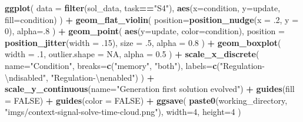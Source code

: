 \documentclass[
]{book}
\newenvironment{Shaded}{\begin{snugshade}}{\end{snugshade}}
\newcommand{\CharTok}[1]{\textcolor[rgb]{0.31,0.60,0.02}{#1}}
\newcommand{\DataTypeTok}[1]{\textcolor[rgb]{0.13,0.29,0.53}{#1}}
\newcommand{\DecValTok}[1]{\textcolor[rgb]{0.00,0.00,0.81}{#1}}
\newcommand{\FloatTok}[1]{\textcolor[rgb]{0.00,0.00,0.81}{#1}}
\newcommand{\KeywordTok}[1]{\textcolor[rgb]{0.13,0.29,0.53}{\textbf{#1}}}
\newcommand{\NormalTok}[1]{#1}
\newcommand{\OperatorTok}[1]{\textcolor[rgb]{0.81,0.36,0.00}{\textbf{#1}}}
\newcommand{\OtherTok}[1]{\textcolor[rgb]{0.56,0.35,0.01}{#1}}
\newcommand{\StringTok}[1]{\textcolor[rgb]{0.31,0.60,0.02}{#1}}
\begin{document}
\begin{Shaded}
\begin{Highlighting}[]
\KeywordTok{ggplot}\NormalTok{( }\DataTypeTok{data =} \KeywordTok{filter}\NormalTok{(sol\_data, task}\OperatorTok{==}\StringTok{"S4"}\NormalTok{), }\KeywordTok{aes}\NormalTok{(}\DataTypeTok{x=}\NormalTok{condition, }\DataTypeTok{y=}\NormalTok{update, }\DataTypeTok{fill=}\NormalTok{condition) ) }\OperatorTok{+}
\StringTok{  }\KeywordTok{geom\_flat\_violin}\NormalTok{(}
    \DataTypeTok{position=}\KeywordTok{position\_nudge}\NormalTok{(}\DataTypeTok{x =} \FloatTok{.2}\NormalTok{, }\DataTypeTok{y =} \DecValTok{0}\NormalTok{),}
    \DataTypeTok{alpha=}\NormalTok{.}\DecValTok{8}
\NormalTok{  ) }\OperatorTok{+}
\StringTok{  }\KeywordTok{geom\_point}\NormalTok{(}
    \KeywordTok{aes}\NormalTok{(}\DataTypeTok{y=}\NormalTok{update, }\DataTypeTok{color=}\NormalTok{condition),}
    \DataTypeTok{position =} \KeywordTok{position\_jitter}\NormalTok{(}\DataTypeTok{width =} \FloatTok{.15}\NormalTok{),}
    \DataTypeTok{size =} \FloatTok{.5}\NormalTok{,}
    \DataTypeTok{alpha =} \FloatTok{0.8}
\NormalTok{  ) }\OperatorTok{+}
\StringTok{  }\KeywordTok{geom\_boxplot}\NormalTok{(}
    \DataTypeTok{width =} \FloatTok{.1}\NormalTok{,}
    \DataTypeTok{outlier.shape =} \OtherTok{NA}\NormalTok{,}
    \DataTypeTok{alpha =} \FloatTok{0.5}
\NormalTok{  ) }\OperatorTok{+}
\StringTok{  }\KeywordTok{scale\_x\_discrete}\NormalTok{(}
    \DataTypeTok{name=}\StringTok{"Condition"}\NormalTok{,}
    \DataTypeTok{breaks=}\KeywordTok{c}\NormalTok{(}\StringTok{"memory"}\NormalTok{, }\StringTok{"both"}\NormalTok{),}
    \DataTypeTok{labels=}\KeywordTok{c}\NormalTok{(}\StringTok{"Regulation{-}}\CharTok{\textbackslash{}n}\StringTok{disabled"}\NormalTok{, }\StringTok{"Regulation{-}}\CharTok{\textbackslash{}n}\StringTok{enabled"}\NormalTok{)}
\NormalTok{  ) }\OperatorTok{+}
\StringTok{  }\KeywordTok{scale\_y\_continuous}\NormalTok{(}\DataTypeTok{name=}\StringTok{"Generation first solution evolved"}\NormalTok{) }\OperatorTok{+}
\StringTok{  }\KeywordTok{guides}\NormalTok{(}\DataTypeTok{fill =} \OtherTok{FALSE}\NormalTok{) }\OperatorTok{+}
\StringTok{  }\KeywordTok{guides}\NormalTok{(}\DataTypeTok{color =} \OtherTok{FALSE}\NormalTok{) }\OperatorTok{+}
\StringTok{  }\KeywordTok{ggsave}\NormalTok{(}
    \KeywordTok{paste0}\NormalTok{(working\_directory, }\StringTok{"imgs/context{-}signal{-}solve{-}time{-}cloud.png"}\NormalTok{),}
    \DataTypeTok{width=}\DecValTok{4}\NormalTok{,}
    \DataTypeTok{height=}\DecValTok{4}
\NormalTok{  )}
\end{Highlighting}
\end{Shaded}
\end{document}
